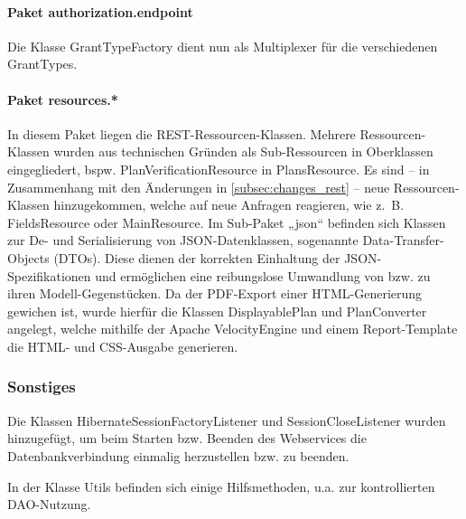\paragraph{Paket authorization.endpoint} Die Klasse GrantTypeFactory dient nun als Multiplexer für die verschiedenen GrantTypes.


\paragraph{Paket resources.*} In diesem Paket liegen die REST-Ressourcen-Klassen. Mehrere Ressourcen-Klassen wurden aus technischen Gründen als Sub-Ressourcen in Oberklassen eingegliedert, bspw. PlanVerificationResource in PlansResource. Es sind -- in Zusammenhang mit den Änderungen in \ref{subsec:changes_rest} -- neue Ressourcen-Klassen hinzugekommen, welche auf neue Anfragen reagieren, wie z.~B. FieldsResource oder MainResource. \newline
Im Sub-Paket „json“ befinden sich Klassen zur De- und Serialisierung von JSON-Datenklassen, sogenannte Data-Transfer-Objects (DTOs). Diese dienen der korrekten Einhaltung der JSON-Spezifikationen und ermöglichen eine reibungslose Umwandlung von bzw. zu ihren Modell-Gegenstücken. \newline
Da der PDF-Export einer HTML-Generierung gewichen ist, wurde hierfür die Klassen DisplayablePlan und PlanConverter angelegt, welche mithilfe der Apache VelocityEngine und einem Report-Template die HTML- und CSS-Ausgabe generieren.



\subsubsection{Sonstiges}

Die Klassen HibernateSessionFactoryListener und SessionCloseListener wurden hinzugefügt, um beim Starten bzw. Beenden des Webservices die Datenbankverbindung einmalig herzustellen bzw. zu beenden.

In der Klasse Utils befinden sich einige Hilfsmethoden, u.a. zur kontrollierten DAO-Nutzung.